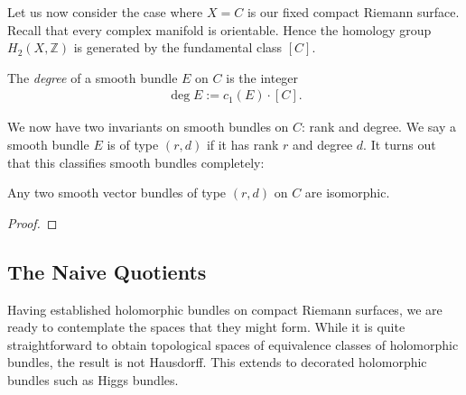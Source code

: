 \documentclass[12pt]{ociamthesis}  %
\begin{document}
Let us now consider the case where $X=C$ is our fixed compact Riemann surface.
Recall that every complex manifold is orientable. Hence the homology
group $H_2(X,\mathbb{Z})$ is generated by the fundamental class $[C]$.

\begin{definition}
  The \emph{degree} of a smooth bundle $E$ on $C$ is the integer
  \begin{align*}
    \deg E := c_1(E)\cdot[C].
  \end{align*}
\end{definition}

We now have two invariants on smooth bundles on $C$: rank and degree.
We say a smooth bundle $E$ is of type $(r,d)$ if it has rank $r$
and degree $d$. It turns out that this classifies smooth bundles
completely:

\begin{theorem}
  Any two smooth vector bundles of type $(r,d)$ on $C$
  are isomorphic.
  \begin{proof}
    \missingproof
  \end{proof}
\end{theorem}

\subsection{The Naive Quotients}

Having established holomorphic bundles on compact Riemann surfaces,
we are ready to contemplate the spaces that they might form. While it is
quite straightforward to obtain topological spaces of equivalence
classes of holomorphic bundles, the result is not Hausdorff.
This extends to decorated holomorphic bundles such as Higgs bundles.
\end{document}
